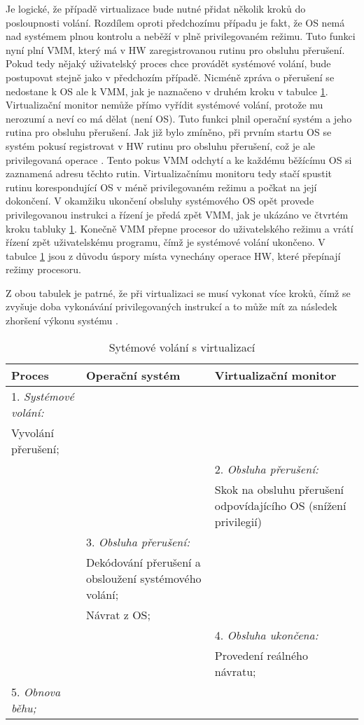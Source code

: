Je logické, že případě virtualizace bude nutné přidat několik kroků do posloupnosti volání. Rozdílem oproti předchozímu případu je fakt, že OS nemá nad systémem plnou kontrolu a neběží v plně privilegovaném režimu. Tuto funkci nyní plní VMM, který
má v HW zaregistrovanou rutinu pro obsluhu přerušení. Pokud tedy nějaký uživatelský proces chce provádět systémové volání, bude postupovat stejně jako v předchozím případě. Nicméně zpráva o přerušení se nedostane k OS ale k VMM, jak je naznačeno v
druhém kroku v tabulce \ref{table:syscall_virt}. Virtualizační monitor nemůže přímo vyřídit systémové volání, protože mu nerozumí a neví co má dělat (není OS). Tuto funkci plnil operační systém a jeho rutina pro obsluhu přerušení. Jak již bylo zmíněno,
při prvním startu OS se systém pokusí registrovat v HW rutinu pro obsluhu přerušení, což je ale privilegovaná operace \cite{vmm_book}. Tento pokus VMM odchytí a ke každému běžícímu OS si zaznamená adresu těchto rutin. Virtualizačnímu monitoru tedy stačí
spustit rutinu korespondující OS v méně privilegovaném režimu a počkat na její dokončení. V okamžiku ukončení obsluhy systémového OS opět provede privilegovanou instrukci a řízení je předá zpět VMM, jak je ukázáno ve čtvrtém kroku tabluky \ref{table:syscall_virt}.
Konečně VMM přepne procesor do uživatelského režimu a vrátí řízení zpět uživatelskému programu, čímž je systémové volání ukončeno. V tabulce \ref{table:syscall_virt} jsou z důvodu úspory místa vynechány operace HW, které přepínají režimy procesoru.

Z obou tabulek je patrné, že při virtualizaci se musí vykonat více kroků, čímž se zvyšuje doba vykonávání privilegovaných instrukcí a to může mít za následek zhoršení výkonu systému \cite{vmm_book}.

\begin{table}
    \centering    
    \begin{tabularx}{\textwidth}{XXX}
    Proces & Operační systém & Virtualizační monitor \\
    \hline
    1. \textit{Systémové volání:} && \\ Vyvolání přerušení; && \\
    && 2. \textit{Obsluha přerušení:} \\ && Skok na obsluhu přerušení odpovídajícího OS (snížení privilegií) \\    
    & 3. \textit{Obsluha přerušení:} & \\ & Dekódování přerušení a obsloužení systémového volání; & \\ & Návrat z OS; & \\
    && 4. \textit{Obsluha ukončena:} \\ && Provedení reálného návratu;\\
    5. \textit{Obnova běhu;} &&\\
    \end{tabularx}

    \caption[Sytémové volání s virtualizací]{Sytémové volání s virtualizací \cite{vmm_book}}
    \label{table:syscall_virt}
\end{table}


